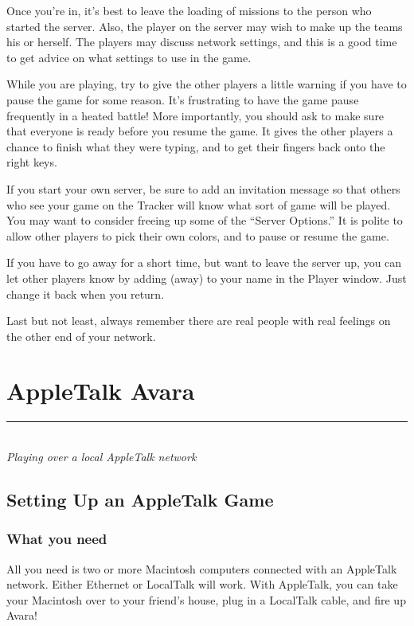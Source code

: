 \documentclass{article}
\let\oldsection\section
\renewcommand\section{\clearpage\oldsection}
\begin{document}
Once you're in, it's best to leave the loading of missions to the person who started the server. Also, the player on the server may wish to make up the teams his or herself. The players may discuss network settings, and this is a good time to get advice on what settings to use in the game.

While you are playing, try to give the other players a little warning if you have to pause the game for some reason. It's frustrating to have the game pause frequently in a heated battle! More importantly, you should ask to make sure that everyone is ready before you resume the game. It gives the other players a chance to finish what they were typing, and to get their fingers back onto the right keys.

If you start your own server, be sure to add an invitation message so that others who see your game on the Tracker will know what sort of game will be played. You may want to consider freeing up some of the ``Server Options.'' It is polite to allow other players to pick their own colors, and to pause or resume the game.

If you have to go away for a short time, but want to leave the server up, you can let other players know by adding (away) to your name in the Player window. Just change it back when you return.

Last but not least, always remember there are real people with real feelings on the other end of your network.


\section{AppleTalk Avara}
\rule{5.5cm}{.15pt}\\
\rmfamily\textit{Playing over a local AppleTalk network}

\subsection{Setting Up an AppleTalk Game}
\subsubsection{What you need}
All you need is two or more Macintosh computers connected with an AppleTalk network. Either Ethernet or LocalTalk will work. With AppleTalk, you can take your Macintosh over to your friend's house, plug in a LocalTalk cable, and fire up Avara!
\end{document}
